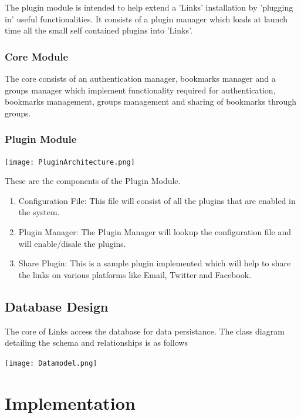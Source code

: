 \documentclass[11pt]{report} %
\begin{document}
The plugin module is intended to help extend a 'Links' installation by 'plugging in' useful functionalities. It consists of a plugin manager which loads at launch time all the small self contained plugins into 'Links'.

\subsection{Core Module}
The core consists of an authentication manager, bookmarks manager and a groups manager which implement functionality required for authentication, bookmarks management, groups management and sharing of bookmarks through groups.

\subsection{Plugin Module}
\texttt{[image: PluginArchitecture.png]}

These are the components of the Plugin Module.
\begin{enumerate}

\item
	Configuration File: This file will consist of all the plugins that are enabled in the system.
\item
	Plugin Manager: The Plugin Manager will lookup the configuration file and will enable/disale the plugins.
\item
	Share Plugin: This is a sample plugin implemented which will help to share the links on various platforms like Email, Twitter and Facebook.
\end{enumerate}
\section{Database Design}
The core of Links access the database for data persistance. The class diagram detailing the schema and relationships is as follows

\texttt{[image: Datamodel.png]}

\chapter{Implementation}
\end{document}
